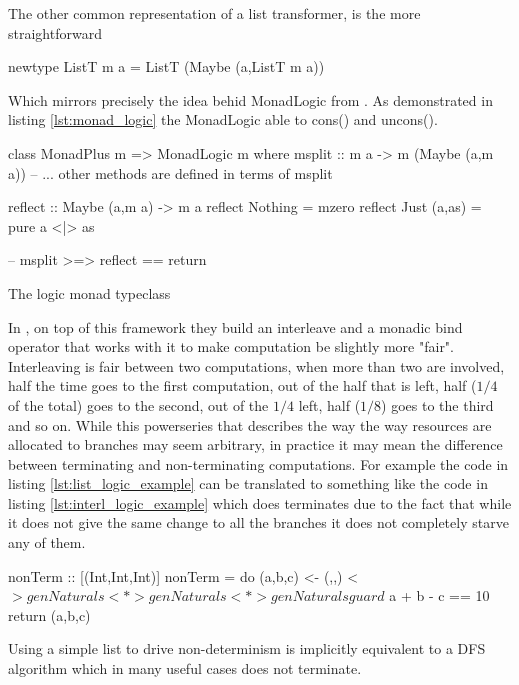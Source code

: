 The other common representation of a list transformer, is the more
straightforward

\begin{haskellcode}
newtype ListT m a = ListT (Maybe (a,ListT m a))
\end{haskellcode}

Which mirrors precisely the idea behid MonadLogic from
\cite{kiselyovBacktrackingInterleavingTerminating}. As demonstrated in
listing \ref{lst:monad_logic} the MonadLogic able to cons()
and uncons().

\begin{code}
\begin{haskellcode}
class MonadPlus m => MonadLogic m where
  msplit :: m a -> m (Maybe (a,m a))
  -- ... other methods are defined in terms of msplit

reflect :: Maybe (a,m a) -> m a
reflect Nothing = mzero
reflect Just (a,as) = pure a <|> as

-- msplit >=> reflect == return
\end{haskellcode}
  \caption{\label{lst:monad_logic}The logic monad typeclass}
\end{code}

In \cite{kiselyovBacktrackingInterleavingTerminating}, on top of this
framework they build an interleave and a monadic bind operator that
works with it to make computation be slightly more "fair".
Interleaving is fair between two computations, when more than two are
involved, half the time goes to the first computation, out of the half
that is left, half (\(1/4\) of the total) goes to the second, out of the
\(1/4\) left, half (\(1/8\)) goes to the third and so on. While this
powerseries that describes the way the way resources are allocated to
branches may seem arbitrary, in practice it may mean the difference
between terminating and non-terminating computations. For example the
code in listing \ref{lst:list_logic_example} can be translated to something like the
code in listing \ref{lst:interl_logic_example} which does terminates due to the fact that
while it does not give the same change to all the branches it does not
completely starve any of them.

\begin{code}
\begin{haskellcode}
nonTerm :: [(Int,Int,Int)]
nonTerm = do
  (a,b,c) <- (,,) <$> genNaturals <*> genNaturals <*> genNaturals
  guard $ a + b - c == 10
  return (a,b,c)
\end{haskellcode}
  \caption{\label{lst:list_logic_example}Using a simple list to drive
    non-determinism is implicitly equivalent to a DFS algorithm which
    in many useful cases does not terminate.}
\end{code}

